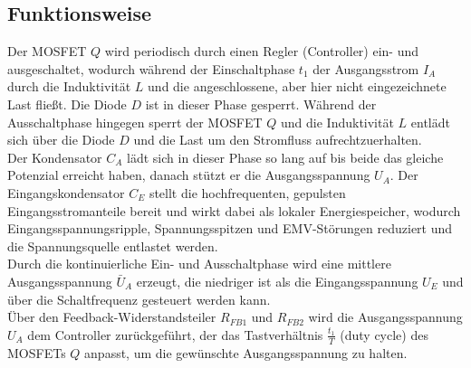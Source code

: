 \subsection{Funktionsweise}
\label{subsec:buck_funktionsweise}
Der MOSFET $Q$ wird periodisch durch einen Regler (Controller) ein- und ausgeschaltet, wodurch während der Einschaltphase $t_{1}$ der Ausgangsstrom $I_{A}$ durch die Induktivität $L$ und die angeschlossene, aber hier nicht eingezeichnete Last fließt. Die Diode $D$ ist in dieser Phase gesperrt. Während der Ausschaltphase  hingegen sperrt der MOSFET $Q$ und die Induktivität $L$ entlädt sich über die Diode $D$ und die Last um den Stromfluss aufrechtzuerhalten. 
\\
Der Kondensator $C_A$ lädt sich in dieser Phase so lang auf bis beide das gleiche Potenzial erreicht haben, danach stützt er die Ausgangsspannung $U_{A}$. Der Eingangskondensator $C_E$ stellt die hochfrequenten, gepulsten Eingangsstromanteile bereit und wirkt dabei als lokaler Energiespeicher, wodurch Eingangsspannungsripple, Spannungsspitzen und EMV-Störungen reduziert und die Spannungsquelle entlastet werden. 
\\
Durch die kontinuierliche Ein- und Ausschaltphase wird eine mittlere Ausgangsspannung $\bar{U}_{A}$ erzeugt, die niedriger ist als die Eingangsspannung $U_{E}$ und über die Schaltfrequenz gesteuert werden kann.
\\
Über den Feedback-Widerstandsteiler $R_{FB1}$ und $R_{FB2}$ wird die Ausgangsspannung $U_{A}$ dem Controller zurückgeführt, der das Tastverhältnis $\frac{t_1}{T}$ (duty cycle) des MOSFETs $Q$ anpasst, um die gewünschte Ausgangsspannung zu halten.
\parencite{schmidt-walter_Abwärtswandler}\parencite{PhilsLab60}

